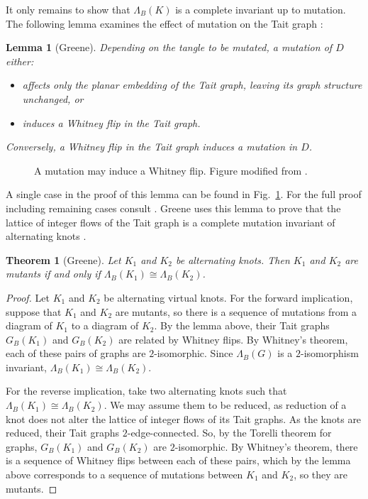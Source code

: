 \documentclass[12pt]{report}
\newtheorem*{theorem}{Theorem}
\newtheorem*{lemma}{Lemma}
\begin{document}
It only remains to show that $\Lambda_{B}(K)$ is a complete invariant up to mutation. The following lemma examines the effect of mutation on the Tait graph \cite[Lemma 4.5]{lattices-graphs-mutation}:

\begin{lemma}[Greene]
Depending on the tangle to be mutated, a mutation of $D$ either:
\begin{itemize}
\item affects only the planar embedding of the Tait graph, leaving its graph structure unchanged, or
\item induces a Whitney flip in the Tait graph.
\end{itemize}
Conversely, a Whitney flip in the Tait graph induces a mutation in $D$.
\end{lemma}

\begin{figure}[hbt!]
	\centering
	\def\svgscale{0.65}
	
	
	\caption{A mutation may induce a Whitney flip. Figure modified from \cite[Fig.~2]{lattices-graphs-mutation}.}
	\label{fig:mutation-whitney-flip}
\end{figure}

A single case in the proof of this lemma can be found in Fig.~\ref{fig:mutation-whitney-flip}. For the full proof including remaining cases consult \cite[Fig. 2-4]{lattices-graphs-mutation}. Greene uses this lemma to prove that the lattice of integer flows of the Tait graph is a complete mutation invariant of alternating knots \cite[Proposition 4.4]{lattices-graphs-mutation}.

\begin{theorem}[Greene]
Let $K_{1}$ and $K_{2}$ be alternating knots. Then $K_{1}$ and $K_{2}$ are mutants if and only if  $\Lambda_{B}(K_{1}) \cong \Lambda_{B}(K_{2})$.
\end{theorem}

\begin{proof}
Let $K_{1}$ and $K_{2}$ be alternating virtual knots. For the forward implication, suppose that $K_{1}$ and $K_{2}$ are mutants, so there is a sequence of mutations from a diagram of $K_{1}$ to a diagram of $K_{2}$. By the lemma above, their Tait graphs $G_{B}(K_{1})$ and $G_{B}(K_{2})$  are related by Whitney flips. By Whitney's theorem, each of these pairs of graphs are $2$-isomorphic. Since $\Lambda_{B}(G)$ is a $2$-isomorphism invariant, $\Lambda_{B}(K_{1}) \cong \Lambda_{B}(K_{2})$.

For the reverse implication, take two alternating knots such that $\Lambda_{B}(K_{1}) \cong \Lambda_{B}(K_{2})$. We may assume them to be reduced, as reduction of a knot does not alter the lattice of integer flows of its Tait graphs. As the knots are reduced, their Tait graphs $2$-edge-connected. So, by the Torelli theorem for graphs, $G_{B}(K_{1})$ and $G_{B}(K_{2})$ are $2$-isomorphic. By Whitney's theorem, there is a sequence of Whitney flips between each of these pairs, which by the lemma above corresponds to a sequence of mutations between $K_{1}$ and $K_{2}$, so they are mutants.
\end{proof}
\end{document}
